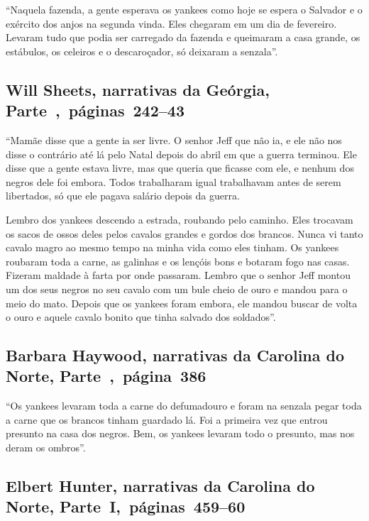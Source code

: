 ``Naquela fazenda, a gente esperava os yankees como hoje se espera o
Salvador e o exército dos anjos na segunda vinda. Eles chegaram em um
dia de fevereiro. Levaram tudo que podia ser carregado da fazenda e
queimaram a casa grande, os estábulos, os celeiros e o descaroçador, só
deixaram a senzala''.

\subsection{Will Sheets, narrativas da Geórgia, Parte~,~páginas~242--43}
\label{ref238}

``Mamãe disse que a gente ia ser livre. O senhor Jeff que não ia, e ele
não nos disse o contrário até lá pelo Natal depois do abril em que a
guerra terminou. Ele disse que a gente estava livre, mas que queria que
ficasse com ele, e nenhum dos negros dele foi embora. Todos trabalharam
igual trabalhavam antes de serem libertados, só que ele pagava salário
depois da guerra.

Lembro dos yankees descendo a estrada, roubando pelo caminho. Eles
trocavam os sacos de ossos deles pelos cavalos grandes e gordos dos
brancos. Nunca vi tanto cavalo magro ao mesmo tempo na minha vida como
eles tinham. Os yankees roubaram toda a carne, as galinhas e os lençóis
bons e botaram fogo nas casas. Fizeram maldade à farta por onde
passaram. Lembro que o senhor Jeff montou um dos seus negros no seu
cavalo com um bule cheio de ouro e mandou para o meio do mato. Depois
que os yankees foram embora, ele mandou buscar de volta o ouro e aquele
cavalo bonito que tinha salvado dos soldados''.

\subsection{Barbara Haywood, narrativas da Carolina do Norte, Parte~,~página~386}
\label{ref133}

``Os yankees levaram toda a carne do defumadouro e foram na senzala
pegar toda a carne que os brancos tinham guardado lá. Foi a primeira vez
que entrou presunto na casa dos negros. Bem, os yankees levaram todo o
presunto, mas nos deram os ombros''.

\subsection{Elbert Hunter, narrativas da Carolina do Norte, Parte~I,~páginas~459--60}
\label{ref156}


